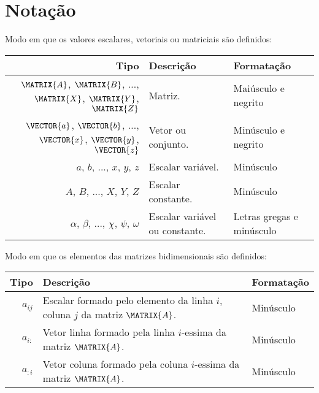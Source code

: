 
\chapter{Notação}


\begin{notation}Modo em que os valores escalares, vetoriais ou matriciais são definidos:\\
\begin{tabular}{r | p{.4\linewidth} | l}
\hline	
Tipo & Descrição & Formatação \\ \hline
$\MATRIX{A}$, $\MATRIX{B}$, ..., $\MATRIX{X}$, $\MATRIX{Y}$, $\MATRIX{Z}$& Matriz. & Maiúsculo e negrito \\
$\VECTOR{a}$, $\VECTOR{b}$, ..., $\VECTOR{x}$, $\VECTOR{y}$, $\VECTOR{z}$ & Vetor ou conjunto. & Minúsculo e negrito \\
$a$, $b$, ..., $x$, $y$, $z$ & Escalar variável. & Minúsculo \\
$A$, $B$, ..., $X$, $Y$, $Z$ & Escalar constante. & Minúsculo \\
$\alpha$, $\beta$, ..., $\chi$, $\psi$, $\omega$ & Escalar variável ou constante. & Letras gregas e minúsculo  \\ \hline
\end{tabular}
\end{notation}

\begin{notation}Modo em que os elementos das matrizes bidimensionais são definidos:\\
\begin{tabular}{r | p{.6\linewidth} | l}
\hline	
Tipo & Descrição & Formatação \\ \hline
$a_{ij}$ & Escalar formado pelo elemento da linha $i$, coluna $j$ da matriz $\MATRIX{A}$. & Minúsculo \\ \hline
$a_{i:}$ & Vetor linha formado pela linha $i$-essima da matriz $\MATRIX{A}$.  & Minúsculo \\
$a_{:i}$ & Vetor coluna formado pela coluna $i$-essima da matriz $\MATRIX{A}$.  & Minúsculo \\
\end{tabular}
\end{notation}


